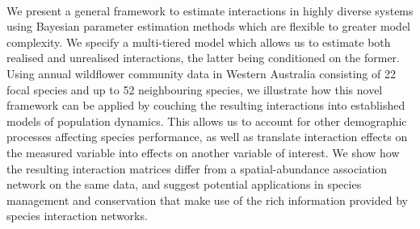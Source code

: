 \documentclass[a4,12pt]{article}
\begin{document}
    \paragraph{} 
    We present a general framework to estimate interactions in highly diverse systems using Bayesian parameter estimation methods which are flexible to greater model complexity. We specify a multi-tiered model which allows us to estimate both realised and unrealised interactions, the latter being conditioned on the former. Using annual wildflower community data in Western Australia consisting of 22 focal species and up to 52 neighbouring species, we illustrate how this novel framework can be applied by couching the resulting interactions into established models of population dynamics. This allows us to account for other demographic processes affecting species performance, as well as translate interaction effects on the measured variable into effects on another variable of interest. We show how the resulting interaction matrices differ from a spatial-abundance association network on the same data, and suggest potential applications in species management and conservation that make use of the rich information provided by species interaction networks.

\end{document}
